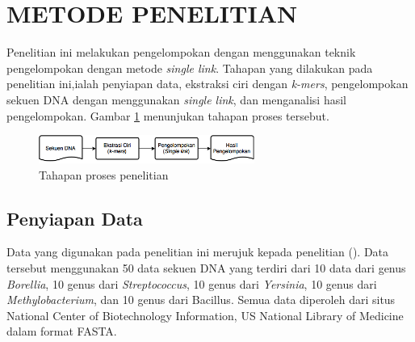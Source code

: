 \section*{METODE PENELITIAN}

Penelitian ini melakukan pengelompokan dengan menggunakan teknik pengelompokan dengan metode \textit{single link}. Tahapan yang dilakukan pada penelitian ini,ialah penyiapan data, ekstraksi ciri dengan \textit{k-mers}, pengelompokan sekuen DNA dengan menggunakan \textit{single link}, dan menganalisi hasil pengelompokan. Gambar \ref{fig:tahapan} menunjukan tahapan proses tersebut.

\begin{figure}[h!] %
\centering
\includegraphics[width=200pt]{metode.png}
\caption{Tahapan proses penelitian}
\label{fig:tahapan}
\end{figure}

\subsection*{Penyiapan Data}

Data yang digunakan pada penelitian ini merujuk kepada penelitian \citeauthor{TAMSIN2013} (\cite*{TAMSIN2013}). Data tersebut menggunakan 50 data sekuen DNA yang terdiri dari 10 data dari genus \textit{Borellia}, 10 genus dari \textit{Streptococcus}, 10 genus dari \textit{Yersinia}, 10 genus dari \textit{Methylobacterium}, dan 10 genus dari Bacillus. Semua data diperoleh dari situs National Center of Biotechnology Information, US National Library of Medicine dalam format FASTA.

